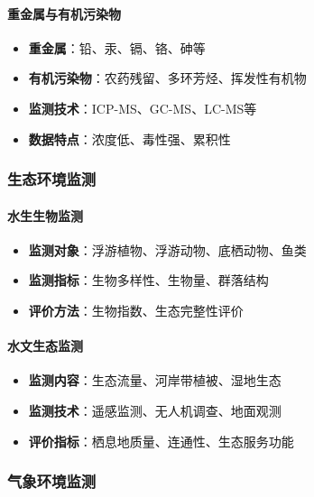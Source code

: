\paragraph{重金属与有机污染物}\label{ux91cdux91d1ux5c5eux4e0eux6709ux673aux6c61ux67d3ux7269}

\begin{itemize}
\tightlist
\item
  \textbf{重金属}：铅、汞、镉、铬、砷等
\item
  \textbf{有机污染物}：农药残留、多环芳烃、挥发性有机物
\item
  \textbf{监测技术}：ICP-MS、GC-MS、LC-MS等
\item
  \textbf{数据特点}：浓度低、毒性强、累积性
\end{itemize}

\subsubsection{生态环境监测}\label{ux751fux6001ux73afux5883ux76d1ux6d4b}

\paragraph{水生生物监测}\label{ux6c34ux751fux751fux7269ux76d1ux6d4b}

\begin{itemize}
\tightlist
\item
  \textbf{监测对象}：浮游植物、浮游动物、底栖动物、鱼类
\item
  \textbf{监测指标}：生物多样性、生物量、群落结构
\item
  \textbf{评价方法}：生物指数、生态完整性评价
\end{itemize}

\paragraph{水文生态监测}\label{ux6c34ux6587ux751fux6001ux76d1ux6d4b}

\begin{itemize}
\tightlist
\item
  \textbf{监测内容}：生态流量、河岸带植被、湿地生态
\item
  \textbf{监测技术}：遥感监测、无人机调查、地面观测
\item
  \textbf{评价指标}：栖息地质量、连通性、生态服务功能
\end{itemize}

\subsubsection{气象环境监测}\label{ux6c14ux8c61ux73afux5883ux76d1ux6d4b}

